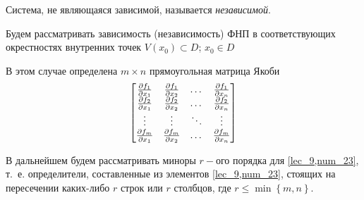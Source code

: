 \documentclass[../../main.tex]{subfiles}
\begin{document}
Система, не являющаяся зависимой, называется \emph{независимой}.

Будем рассматривать зависимость (независимость) ФНП
в соответствующих окрестностях внутренних точек
$V(x_0) \subset D$; $x_0 \in D$

В этом случае определена $m\times n$ 
прямоугольная матрица Якоби
\begin{equation}
 \label{lec_9,num_23}
 \begin{bmatrix}
        \frac{\partial f_1}{\partial x_1} 
        & \frac{\partial f_1}{\partial x_2} & \dots & 
        \frac{\partial f_1}{\partial x_n} \\
        \frac{\partial f_2}{\partial x_1} & \frac{\partial f_2}{\partial x_2} &\dots & 
        \frac{\partial f_2}{\partial x_n} \\
        \vdots & \vdots & \ddots & \vdots \\
        \frac{\partial f_m}{\partial x_1} & \frac{\partial f_m}{\partial x_2} & \dots & 
        \frac{\partial f_m}{\partial x_n} 
    \end{bmatrix}
\end{equation}

В дальнейшем будем рассматривать миноры $r-$ого порядка
для \eqref{lec_9,num_23}, т.~е. определители, 
составленные из элементов \eqref{lec_9,num_23}, 
стоящих на пересечении каких-либо $r$ строк или 
$r$ столбцов, где 
$r \leq \min\left\{ m, n\right\}$.
\end{document}
